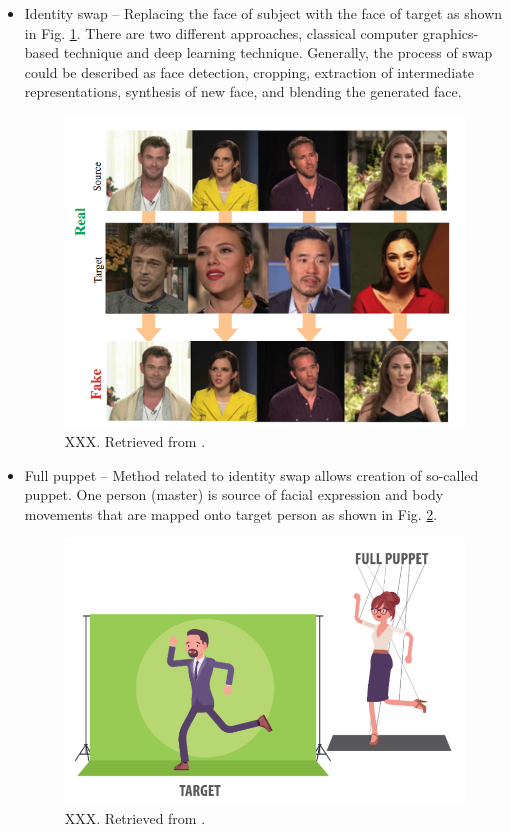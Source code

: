 \begin{itemize}
\item Identity swap – Replacing the face of subject with the face of target as shown in Fig. \ref{fig:idenity_swap}. There are two different approaches, classical computer graphics-based technique and deep learning technique. Generally, the process of swap could be described as face detection, cropping, extraction of intermediate representations, synthesis of new face, and blending the generated face.
\begin{figure}[H]
    \centering
    \includegraphics[width=.68\linewidth]{other-fig/idenity_swap.png}        
    \caption{XXX. Retrieved from \cite{IntroductionToDigitalFaceManipulation}.}
\label{fig:idenity_swap}
\end{figure}

\item Full puppet – Method related to identity swap allows creation of so-called puppet. One person (master) is source of facial expression and body movements that are mapped onto target person as shown in Fig. \ref{fig:full_puppet}. \cite{IncreasingThreatofDeepfakeIdentites}
\begin{figure}[H]
    \centering
    \includegraphics[width=.6\linewidth]{other-fig/full_puppet.png}        
    \caption{XXX. Retrieved from \cite{TheThreatOfDeepfakes}.}
\label{fig:full_puppet}
\end{figure}


\end{itemize}

